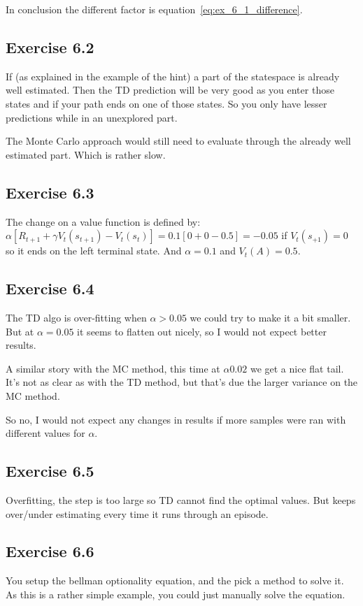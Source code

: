 In conclusion the different factor is equation~\ref{eq:ex_6_1_difference}.

\subsection{Exercise 6.2}
If (as explained in the example of the hint) a part of the statespace is already well estimated. Then the TD prediction will be very good as you enter those states and if your path ends on one of those states. So you only have lesser predictions while in an unexplored part.

The Monte Carlo approach would still need to evaluate through the already well estimated part. Which is rather slow.

\subsection{Exercise 6.3}
The change on a value function is defined by:  $\alpha [R_{t+1} + \gamma V_t(s_{t+1})-V_t(s_t)] = 0.1[0 + 0 - 0.5]=-0.05$ if $V_t(s_{+1}) = 0$ so it ends on the left terminal state. And $\alpha=0.1$ and $V_t(A)=0.5$.

\subsection{Exercise 6.4}
The TD algo is over-fitting when $\alpha>0.05$ we could try to make it a bit smaller. But at $\alpha=0.05$ it seems to flatten out nicely, so I would not expect better results.

A similar story with the MC method, this time at $\alpha0.02$ we get a nice flat tail. It's not as clear as with the TD method, but that's due the larger variance on the MC method.

So no, I would not expect any changes in results if more samples were ran with different values for $\alpha$.

\subsection{Exercise 6.5}
Overfitting, the step is too large so TD cannot find the optimal values. But keeps over/under estimating every time it runs through an episode.

\subsection{Exercise 6.6}
You setup the bellman optionality equation, and the pick a method to solve it. As this is a rather simple example, you could just manually solve the equation.

